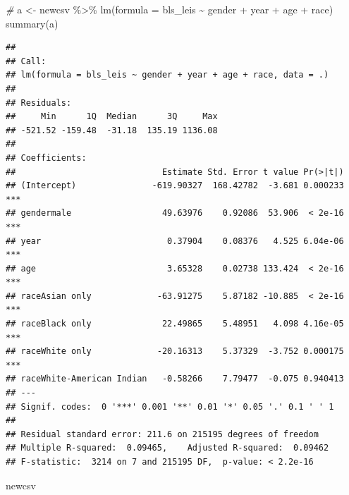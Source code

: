 \documentclass[
]{article}
\newenvironment{Shaded}{\begin{snugshade}}{\end{snugshade}}
\newcommand{\AttributeTok}[1]{\textcolor[rgb]{0.77,0.63,0.00}{#1}}
\newcommand{\CommentTok}[1]{\textcolor[rgb]{0.56,0.35,0.01}{\textit{#1}}}
\newcommand{\FunctionTok}[1]{\textcolor[rgb]{0.00,0.00,0.00}{#1}}
\newcommand{\NormalTok}[1]{#1}
\newcommand{\OtherTok}[1]{\textcolor[rgb]{0.56,0.35,0.01}{#1}}
\newcommand{\SpecialCharTok}[1]{\textcolor[rgb]{0.00,0.00,0.00}{#1}}
\begin{document}
\begin{Shaded}
\begin{Highlighting}[]
\CommentTok{\# }
\NormalTok{a }\OtherTok{\textless{}{-}}\NormalTok{ newcsv }\SpecialCharTok{\%\textgreater{}\%}
  \FunctionTok{lm}\NormalTok{(}\AttributeTok{formula =}\NormalTok{ bls\_leis }\SpecialCharTok{\textasciitilde{}}\NormalTok{ gender }\SpecialCharTok{+}\NormalTok{ year }\SpecialCharTok{+}\NormalTok{ age }\SpecialCharTok{+}\NormalTok{ race) }
\FunctionTok{summary}\NormalTok{(a)}
\end{Highlighting}
\end{Shaded}

\begin{verbatim}
## 
## Call:
## lm(formula = bls_leis ~ gender + year + age + race, data = .)
## 
## Residuals:
##     Min      1Q  Median      3Q     Max 
## -521.52 -159.48  -31.18  135.19 1136.08 
## 
## Coefficients:
##                             Estimate Std. Error t value Pr(>|t|)    
## (Intercept)               -619.90327  168.42782  -3.681 0.000233 ***
## gendermale                  49.63976    0.92086  53.906  < 2e-16 ***
## year                         0.37904    0.08376   4.525 6.04e-06 ***
## age                          3.65328    0.02738 133.424  < 2e-16 ***
## raceAsian only             -63.91275    5.87182 -10.885  < 2e-16 ***
## raceBlack only              22.49865    5.48951   4.098 4.16e-05 ***
## raceWhite only             -20.16313    5.37329  -3.752 0.000175 ***
## raceWhite-American Indian   -0.58266    7.79477  -0.075 0.940413    
## ---
## Signif. codes:  0 '***' 0.001 '**' 0.01 '*' 0.05 '.' 0.1 ' ' 1
## 
## Residual standard error: 211.6 on 215195 degrees of freedom
## Multiple R-squared:  0.09465,    Adjusted R-squared:  0.09462 
## F-statistic:  3214 on 7 and 215195 DF,  p-value: < 2.2e-16
\end{verbatim}

\begin{Shaded}
\begin{Highlighting}[]
\NormalTok{newcsv}
\end{Highlighting}
\end{Shaded}
\end{document}
